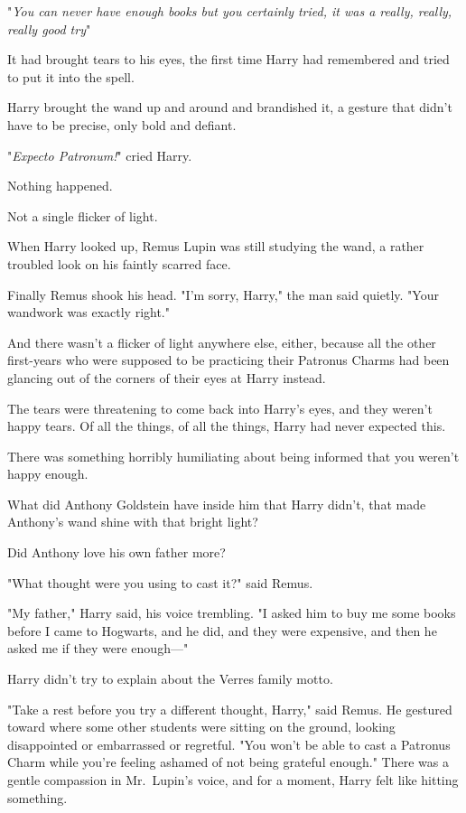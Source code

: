 "\emph{You can never have enough books{\el} but you certainly tried, it was
a really, really, really good try{\el}}"

It had brought tears to his eyes, the first time Harry had remembered and tried
to put it into the spell.

Harry brought the wand up and around and brandished it, a gesture that didn't
have to be precise, only bold and defiant.

"\emph{Expecto Patronum!}" cried Harry.

Nothing happened.

Not a single flicker of light.

When Harry looked up, Remus Lupin was still studying the wand, a rather
troubled look on his faintly scarred face.

Finally Remus shook his head. "I'm sorry, Harry," the man said quietly. "Your
wandwork was exactly right."

And there wasn't a flicker of light anywhere else, either, because all the
other first-years who were supposed to be practicing their Patronus Charms had
been glancing out of the corners of their eyes at Harry instead.

The tears were threatening to come back into Harry's eyes, and they weren't
happy tears. Of all the things, of all the things, Harry had never expected
this.

There was something horribly humiliating about being informed that you weren't
happy enough.

What did Anthony Goldstein have inside him that Harry didn't, that made
Anthony's wand shine with that bright light?

Did Anthony love his own father more?

"What thought were you using to cast it?" said Remus.

"My father," Harry said, his voice trembling. "I asked him to buy me some books
before I came to Hogwarts, and he did, and they were expensive, and then he
asked me if they were enough—"

Harry didn't try to explain about the Verres family motto.

"Take a rest before you try a different thought, Harry," said Remus. He
gestured toward where some other students were sitting on the ground, looking
disappointed or embarrassed or regretful. "You won't be able to cast a Patronus
Charm while you're feeling ashamed of not being grateful enough." There was a
gentle compassion in Mr.~Lupin's voice, and for a moment, Harry felt like
hitting something.

